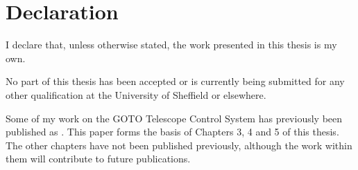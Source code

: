 \chapter*{Declaration}

\begin{onehalfspace}

\noindent I declare that, unless otherwise stated, the work presented in this thesis is my own.

\bigskip

\noindent No part of this thesis has been accepted or is currently being submitted for any other qualification at the University of Sheffield or elsewhere.

\bigskip

\noindent Some of my work on the GOTO Telescope Control System has previously been published as \citet{Dyer}. This paper forms the basis of Chapters 3, 4 and 5 of this thesis. The other chapters have not been published previously, although the work within them will contribute to future publications.

\end{onehalfspace}
